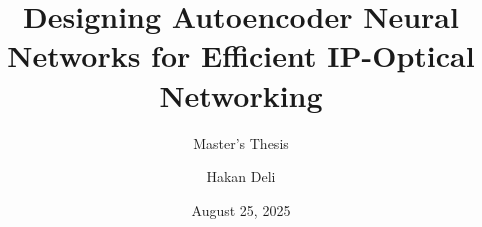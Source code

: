 \documentclass[english,aspectratio=169,dvipsnames]{beamer}
\title{Designing Autoencoder Neural Networks for Efficient IP-Optical Networking}
\subtitle{Master's Thesis}
\date{August 25, 2025} %
\author{Hakan Deli}
\begin{document}

\breadcrumbson


%         		
\end{document}
